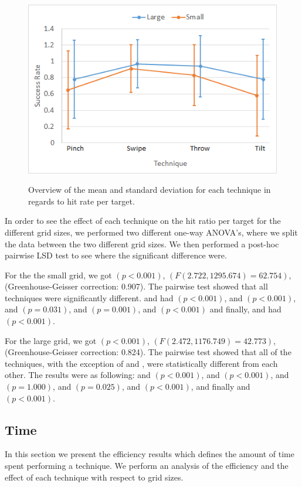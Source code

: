 \begin{figure}[H]
	{\includegraphics[width = 1\columnwidth ]{images/success.png}} 
	\caption{
		Overview of the mean and standard deviation for each technique in regards to hit rate per target.
	}
	\label{fig:successResults}
\end{figure}

In order to see the effect of each technique on the hit ratio per target for the different grid sizes, we performed two different one-way ANOVA's, where we split the data between the two different grid sizes.
We then performed a post-hoc pairwise LSD test to see where the significant difference were.
 
For the the small grid, we got $(p<0.001)$, $(F(2.722, 1295.674)=62.754)$, (Greenhouse-Geisser correction: 0.907).
The pairwise test showed that all techniques were significantly different. \pinch and \swipe had $(p < 0.001)$, \pinch and \throw $(p <0.001)$, \pinch and \tilt $(p = 0.031)$, \swipe and \throw $(p=0.001)$, \swipe and \tilt $(p < 0.001)$ and finally, \throw and \tilt had $(p<0.001)$. 

For the large grid, we got $(p<0.001)$, $(F(2.472, 1176.749)=42.773)$, (Greenhouse-Geisser correction: 0.824).
The pairwise test showed that all of the techniques, with the exception of \pinch and \tilt, were statistically different from each other. The results were as following: \pinch and \swipe $(p<0.001)$, \pinch and \throw $(p<0.001)$, \pinch and \tilt $(p=1.000)$, \swipe and \throw $(p=0.025)$, \swipe and \tilt $(p<0.001)$, and finally \throw and \tilt $(p<0.001)$.

\subsection{Time}
In this section we present the efficiency results which defines the amount of time spent performing a technique.
We perform an analysis of the efficiency and the effect of each technique with respect to grid sizes.

